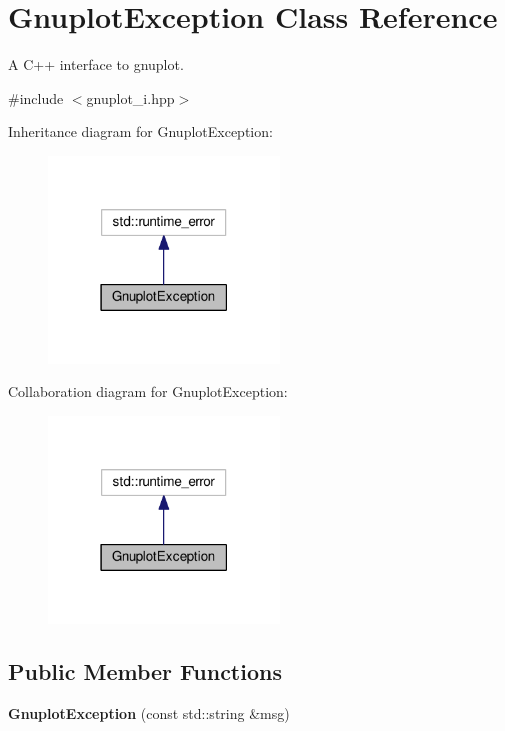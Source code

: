 \hypertarget{class_gnuplot_exception}{}\section{Gnuplot\+Exception Class Reference}
\label{class_gnuplot_exception}


A C++ interface to gnuplot.  




{\ttfamily \#include $<$gnuplot\+\_\+i.\+hpp$>$}



Inheritance diagram for Gnuplot\+Exception\+:\nopagebreak
\begin{figure}[H]
\begin{center}
\leavevmode
\includegraphics[width=174pt]{class_gnuplot_exception__inherit__graph}
\end{center}
\end{figure}


Collaboration diagram for Gnuplot\+Exception\+:\nopagebreak
\begin{figure}[H]
\begin{center}
\leavevmode
\includegraphics[width=174pt]{class_gnuplot_exception__coll__graph}
\end{center}
\end{figure}
\subsection*{Public Member Functions}
\begin{DoxyCompactItemize}
\item 
\mbox{\label{class_gnuplot_exception_a8b324a9ef4d3f75079d41ecd61c62d44}} 
{\bfseries Gnuplot\+Exception} (const std\+::string \&msg)
\end{DoxyCompactItemize}


